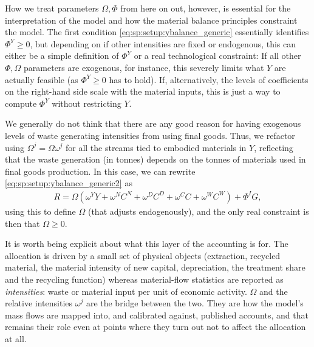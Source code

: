 \bigskip
How we treat parameters $\Omega, \Phi$ from here on out, however, is essential for the interpretation of the model and how the material balance principles constraint the model. The first condition \eqref{eq:sp:setup:ybalance_generic} essentially identifies $\Phi^Y\geq0$, but depending on if other intensities are fixed or endogenous, this can either be a simple definition of $\Phi^Y$ or a real technological constraint: If all other $\Phi, \Omega$ parameters are exogenous, for instance, this severely limits what $Y$ are actually feasible (as $\Phi^Y \geq 0$ has to hold). If, alternatively, the levels of coefficients on the right-hand side scale with the material inputs, this is just a way to compute $\Phi^Y$ without restricting $Y$. 




We generally do not think that there are any good reason for having exogenous levels of waste generating intensities from using final goods. Thus, we refactor using $\Omega^j = \Omega \omega^j$ for all the streams tied to embodied materials in $Y$, reflecting that the waste generation (in tonnes) depends on the tonnes of materials used in final goods production. In this case, we can rewrite \eqref{eq:sp:setup:ybalance_generic2} as
\begin{align}
    R =  \Omega \left(\omega^Y Y + \omega^{N}C^N + \omega^{D}C^D + \omega^C C + \omega^W C^W\right) + \Phi^I G \label{eq:sp:setup:ybalance_Omega},
\end{align}
using this to define $\Omega$ (that adjusts endogenously), and the only real constraint is then that $\Omega\geq0$.

It is worth being explicit about what this layer of the accounting is for. The allocation is driven by a small set of physical objects (extraction, recycled material, the material intensity of new capital, depreciation, the treatment share and the recycling function) whereas material-flow statistics are reported as \emph{intensities}: waste or material input per unit of economic activity. $\Omega$ and the relative intensities $\omega^j$ are the bridge between the two. They are how the model's mass flows are mapped into, and calibrated against, published accounts, and that remains their role even at points where they turn out not to affect the allocation at all.

